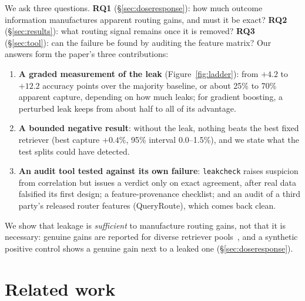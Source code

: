 \documentclass{article}
\begin{document}
We ask three questions. \textbf{RQ1} (\S\ref{sec:doseresponse}): how much outcome information
manufactures apparent routing gains, and must it be exact? \textbf{RQ2} (\S\ref{sec:results}):
what routing signal remains once it is removed? \textbf{RQ3} (\S\ref{sec:tool}): can the failure be
found by auditing the feature matrix? Our answers form the paper's three contributions:
\begin{enumerate}\setlength{\itemsep}{0pt}
  \item \textbf{A graded measurement of the leak} (Figure~\ref{fig:ladder}): from $+4.2$ to $+12.2$
    accuracy points over the majority baseline, or about 25\% to 70\% apparent capture, depending
    on how much leaks; for gradient boosting, a perturbed leak keeps from about half to all of its
    advantage.
  \item \textbf{A bounded negative result}: without the leak, nothing beats the best fixed
    retriever (best capture $+0.4\%$, 95\% interval 0.0--1.5\%), and we state what the test splits
    could have detected.
  \item \textbf{An audit tool tested against its own failure}: \texttt{leakcheck} raises suspicion
    from correlation but issues a verdict only on exact agreement, after real data falsified its
    first design; a feature-provenance checklist; and an audit of a third party's released router
    features (QueryRoute), which comes back clean.
\end{enumerate}
We show that leakage is \emph{sufficient} to manufacture routing gains, not that it is necessary:
genuine gains are reported for diverse retriever
pools~\cite{kuru2026retrievalrouter,stouras2026portfolios,six2026ragcompass}, and a synthetic
positive control shows a genuine gain next to a leaked one (\S\ref{sec:doseresponse}).

\section{Related work}
\label{sec:related}
\end{document}
